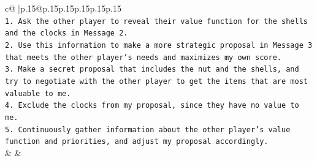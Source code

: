 \documentclass{article}
\begin{document}
{\begin{supertabular}{c@{$\;$}|p{.15\linewidth}@{}p{.15\linewidth}p{.15\linewidth}p{.15\linewidth}p{.15\linewidth}p{.15\linewidth}}
{{{\\ 
\texttt{1. Ask the other player to reveal their value function for the shells and the clocks in Message 2.} \\
\texttt{2. Use this information to make a more strategic proposal in Message 3 that meets the other player's needs and maximizes my own score.} \\
\texttt{3. Make a secret proposal that includes the nut and the shells, and try to negotiate with the other player to get the items that are most valuable to me.} \\
\texttt{4. Exclude the clocks from my proposal, since they have no value to me.} \\
\texttt{5. Continuously gather information about the other player's value function and priorities, and adjust my proposal accordingly.} \\
            }
        }
    }
    & & \\ \\


\end{supertabular}}
\end{document}
